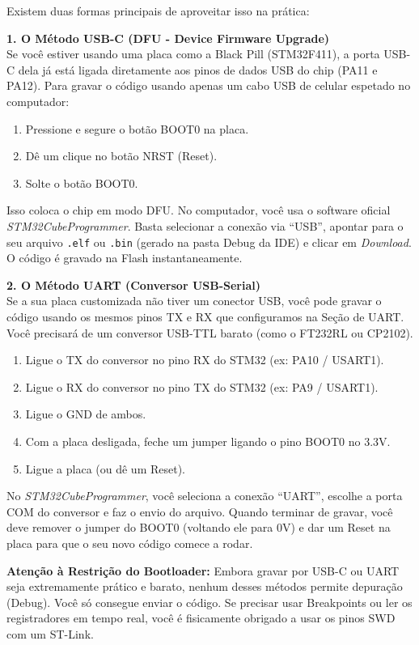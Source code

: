 \documentclass[12pt,a4paper]{article}
\begin{document}
Existem duas formas principais de aproveitar isso na prática:

\textbf{1. O Método USB-C (DFU - Device Firmware Upgrade)}\\
Se você estiver usando uma placa como a Black Pill (STM32F411), a porta USB-C dela já está ligada diretamente aos pinos de dados USB do chip (PA11 e PA12). Para gravar o código usando apenas um cabo USB de celular espetado no computador:
\begin{enumerate}
    \item Pressione e segure o botão BOOT0 na placa.
    \item Dê um clique no botão NRST (Reset).
    \item Solte o botão BOOT0.
\end{enumerate}
Isso coloca o chip em modo DFU. No computador, você usa o software oficial \textit{STM32CubeProgrammer}. 
Basta selecionar a conexão via ``USB'', apontar para o seu arquivo \texttt{.elf} ou \texttt{.bin} (gerado na pasta Debug da IDE) e clicar em \textit{Download}. O código é gravado na Flash instantaneamente.

\textbf{2. O Método UART (Conversor USB-Serial)}\\
Se a sua placa customizada não tiver um conector USB, você pode gravar o código usando os mesmos pinos TX e RX que configuramos na Seção de UART. Você precisará de um conversor USB-TTL barato (como o FT232RL ou CP2102).
\begin{enumerate}
    \item Ligue o TX do conversor no pino RX do STM32 (ex: PA10 / USART1).
    \item Ligue o RX do conversor no pino TX do STM32 (ex: PA9 / USART1).
    \item Ligue o GND de ambos.
    \item Com a placa desligada, feche um jumper ligando o pino BOOT0 no 3.3V.
    \item Ligue a placa (ou dê um Reset).
\end{enumerate}
No \textit{STM32CubeProgrammer}, você seleciona a conexão ``UART'', escolhe a porta COM do conversor e faz o envio do arquivo. Quando terminar de gravar, você deve remover o jumper do BOOT0 (voltando ele para 0V) e dar um Reset na placa para que o seu novo código comece a rodar.

\textbf{Atenção à Restrição do Bootloader:} Embora gravar por USB-C ou UART seja extremamente prático e barato, nenhum desses métodos permite depuração (Debug). Você só consegue enviar o código. Se precisar usar Breakpoints ou ler os registradores em tempo real, você é fisicamente obrigado a usar os pinos SWD com um ST-Link.
\end{document}

